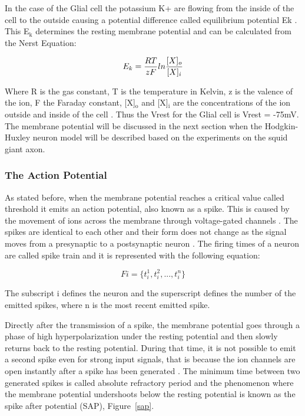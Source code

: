 In the case of the Glial cell the potassium K+ are flowing from the inside of the cell to the outside causing a potential difference called equilibrium potential Ek \cite{princNeuron} . This E$_{\textrm{k}}$ determines the resting membrane potential and can be calculated from the Nerst Equation:


\begin{equation} \label{eq:EK}
	E_k = {RT \over zF} ln {[X]_o \over [X]_i}
\end{equation}
 
Where R is the gas constant, T is the temperature in Kelvin, z is the valence of the ion, F the Faraday constant, [X]$_{\textrm{o}}$ and [X]$_{\textrm{i}}$ are the concentrations of the ion outside and inside of the cell \cite{princNeuron}.  Thus the Vrest for the Glial cell is Vrest = -75mV. The membrane potential will be discussed in the next section when the Hodgkin-Huxley neuron model will be described based on the experiments on the squid giant axon.

\subsubsection{The Action Potential}

As stated before, when the membrane potential reaches a critical value called threshold it emits an action potential, also known as a spike. This is caused by the movement of ions across the membrane through voltage-gated channels \cite{princNeuron}.  The spikes are identical to each other and their form does not change as the signal moves from a presynaptic to a postsynaptic neuron \cite{gernstbook}. The firing times of a neuron are called spike train and it is represented with the following equation: 

\begin{equation} \label{eq:spiketrain}
	Fi=\{t^1_i, t^2_i, ..., t^n_i\}
\end{equation}

The subscript i defines the neuron and the superscript defines the number of the emitted spikes, where n is the most recent emitted spike.

	Directly after the transmission of a spike, the membrane potential goes through a phase of high hyperpolarization under the resting potential and then slowly returns back to the resting potential. During that time, it is not possible to emit a second spike even for strong input signals, that is because the ion channels are open instantly after a spike has been generated \cite{gernstbook}. The minimum time between two generated spikes is called absolute refractory period and the phenomenon where the membrane potential undershoots below the resting potential is known as the spike after potential (SAP), Figure~\ref{sap}.


